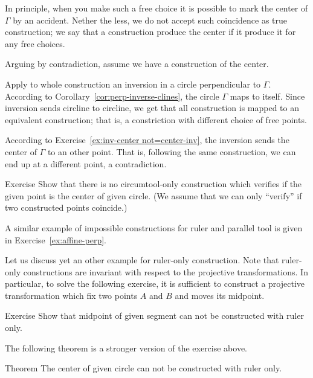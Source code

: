 In principle, when you make such a free choice it is possible to mark the center of $\Gamma$ by an accident.
Nether the less, we do not accept such coincidence as true construction; 
we say that a construction produce the center if it produce it for any free choices.


\label{page:solution-for-ex:circumtool}
Arguing by contradiction, 
assume we have a construction of the center. 

Apply to whole construction an inversion in a circle perpendicular to  $\Gamma$.
According to Corollary~\ref{cor:perp-inverse-clines},
the circle
$\Gamma$ maps to itself.
Since inversion sends circline to circline, we get that all construction is mapped to an equivalent construction; 
that is, a constriction with different choice of free points.

According to Exercise~\ref{ex:inv-center not=center-inv}, 
the inversion sends the center of $\Gamma$ to an other point.
That is, following the same construction, we can end up at a different point, a contradiction.
\qeds

\begin{thm}{Exercise}\label{ex:center-verify}
Show that there is no circumtool-only construction which verifies if the given point is the center of given circle.
(We assume that we can only ``verify'' if two constructed points coincide.) 
\end{thm}

A similar example of impossible constructions for ruler and parallel tool
 is given in Exercise~\ref{ex:affine-perp}.
 
Let us discuss yet an other example for ruler-only construction.
Note that ruler-only constructions are invariant with respect to the projective transformations. 
In particular, to solve the following exercise, it is sufficient to construct a projective transformation which fix two points $A$ and $B$ and moves its midpoint.

\begin{thm}{Exercise}\label{ex:midpoint-proj}
Show that  midpoint of given segment can not be constructed with ruler only.
\end{thm}

The following theorem is a stronger version of the exercise above.

\begin{thm}{Theorem}\label{thm:circle-center-proj}
The center of given circle can not be constructed with ruler only.
\end{thm}

